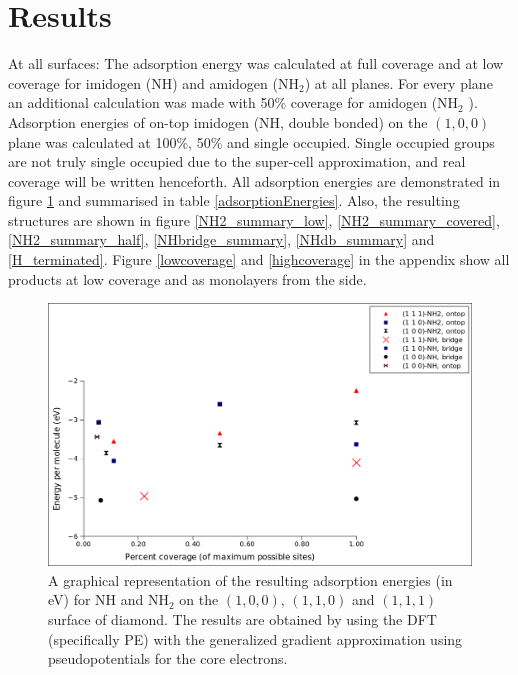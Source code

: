 \documentclass[10pt,a4paper]{article}
\begin{document}
\section{Results}
At all surfaces: The adsorption energy was calculated at full coverage and at low coverage for imidogen (NH) and amidogen (NH$_2$) at all planes. For every plane an additional calculation was made with 50\% coverage for amidogen (NH$_2$ ). Adsorption energies of on-top imidogen (NH, double bonded) on the $(1,  0,  0)$ plane was calculated at 100\%, 50\% and single occupied. Single occupied groups are not truly single occupied due to the super-cell approximation, and real coverage will be written henceforth. All adsorption energies are demonstrated in figure \ref{NH2diagram} and summarised in table \ref{adsorptionEnergies}. Also, the resulting structures are shown in figure   \ref{NH2_summary_low}, \ref{NH2_summary_covered}, \ref{NH2_summary_half}, \ref{NHbridge_summary}, \ref{NHdb_summary} and \ref{H_terminated}. Figure \ref{lowcoverage} and \ref{highcoverage} in the appendix show all products at low coverage and as monolayers from the side.

\begin{figure} \captionsetup{width=.8\linewidth} \caption{A graphical representation of the resulting adsorption energies (in eV) for NH and NH$_2$ on the $(1,  0,  0)$, $(1,  1,  0)$ and $(1,  1, 1)$ surface of diamond. The results are obtained by using the DFT (specifically PE) with the generalized gradient approximation using pseudopotentials for the core electrons.} \label{NH2diagram}
\includegraphics[width=.8\linewidth]{pictures/NH2diagram.png}
\end{figure}
\end{document}
